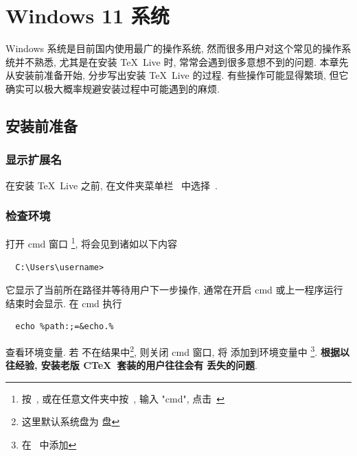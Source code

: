 
\chapter{Windows 11 系统}

Windows 系统是目前国内使用最广的操作系统,
然而很多用户对这个常见的操作系统并不熟悉,
尤其是在安装 \TeX~Live 时,
常常会遇到很多意想不到的问题.
本章先从安装前准备开始,
分步写出安装 \TeX~Live 的过程.
有些操作可能显得繁琐,
但它确实可以极大概率规避安装过程中可能遇到的麻烦.

\section{安装前准备}\label{sec:windows:prepare}

\subsection{显示扩展名}

在安装 \TeX~Live 之前,
在文件夹菜单栏\  中选择\ .

\subsection{检查环境}

打开 \textsf{cmd} 窗口%
\footnote{按\ \keys{\faWindows},
或在任意文件夹中按\ ,
输入 "cmd",
点击\ \keys{\enter}},
将会见到诸如以下内容
\begin{lstlisting}
  C:\Users\username>
\end{lstlisting}
它显示了当前所在路径并等待用户下一步操作,
通常在开启 \textsf{cmd} 或上一程序运行结束时会显示.
在 \textsf{cmd} 执行
\begin{lstlisting}
  echo %path:;=&echo.%
\end{lstlisting}
查看环境变量.
若 
不在结果中\footnote{这里默认系统盘为  盘},
则关闭 \textsf{cmd} 窗口,
将 
添加到环境变量中%
\footnote{在\  中添加}.
\textbf{根据以往经验, 安装老版 C\TeX\ 套装的用户往往会有}
 \textbf{丢失的问题}.

